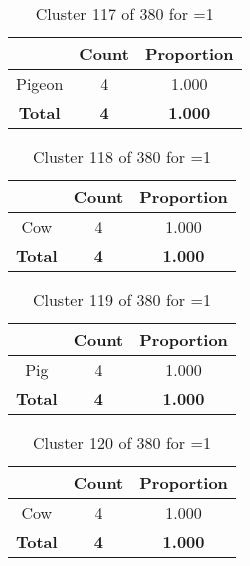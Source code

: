 \begin{table}[ht!]
\centering
\begin{tabular}{|c|c|c|}
\hline
\bf \Spec{} &\bf Count &\bf Proportion\\ \hline \hline
Pigeon & 4 & 1.000\\ \hline
\hline
\bf Total & \bf 4 & \bf 1.000\\ \hline
\end{tabular}
\label{tab:cluster:117:1}
\caption{Cluster 117 of 380 for \minneigh{}=1}
\end{table}

\begin{table}[ht!]
\centering
\begin{tabular}{|c|c|c|}
\hline
\bf \Spec{} &\bf Count &\bf Proportion\\ \hline \hline
Cow & 4 & 1.000\\ \hline
\hline
\bf Total & \bf 4 & \bf 1.000\\ \hline
\end{tabular}
\label{tab:cluster:118:1}
\caption{Cluster 118 of 380 for \minneigh{}=1}
\end{table}

\begin{table}[ht!]
\centering
\begin{tabular}{|c|c|c|}
\hline
\bf \Spec{} &\bf Count &\bf Proportion\\ \hline \hline
Pig & 4 & 1.000\\ \hline
\hline
\bf Total & \bf 4 & \bf 1.000\\ \hline
\end{tabular}
\label{tab:cluster:119:1}
\caption{Cluster 119 of 380 for \minneigh{}=1}
\end{table}

\clearpage
\begin{table}[ht!]
\centering
\begin{tabular}{|c|c|c|}
\hline
\bf \Spec{} &\bf Count &\bf Proportion\\ \hline \hline
Cow & 4 & 1.000\\ \hline
\hline
\bf Total & \bf 4 & \bf 1.000\\ \hline
\end{tabular}
\label{tab:cluster:120:1}
\caption{Cluster 120 of 380 for \minneigh{}=1}
\end{table}

